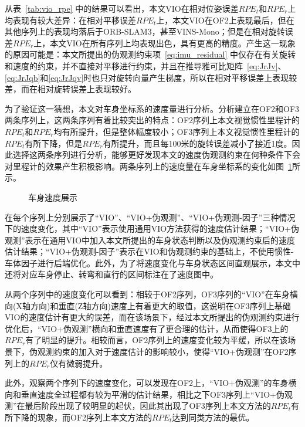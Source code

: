 从表~\ref{tab:vio_rpe} 中的结果可以看出，本文VIO在相对位姿误差$RPE_t$和$RPE_r$上均表现有较大差异：在相对平移误差$RPE_t$上，本文VIO在OF2上表现最后，但在其他序列上的表现均落后于ORB-SLAM3，甚至VINS-Mono；但是在相对旋转误差$RPE_r$上，本文VIO在所有序列上均表现出色，具有更高的精度。产生这一现象的原因可能是：本文所提出的伪观测约束项~\eqref{eq:imu_residual} 中仅存在有关旋转和速度的约束，并不直接对平移进行约束，并且在推导雅可比矩阵~\eqref{eq:JrJv}、\eqref{eq:JrJqb}和\eqref{eq:JrJqv}时也只对旋转向量产生梯度，所以在相对平移误差上表现较差，而在相对旋转误差上表现较好。

为了验证这一猜想，本文对车身坐标系的速度量进行分析。分析建立在OF2和OF3两条序列上，这两条序列有着比较突出的特点：OF2序列上本文视觉惯性里程计的$RPE_t$和$RPE_r$均有所提升，但是整体幅度较小；OF3序列上本文视觉惯性里程计的$RPE_t$有所下降，但是$RPE_r$有所提升，而且每100米的旋转误差减小了接近1度。因此选择这两条序列进行分析，能够更好发现本文的速度伪观测约束在何种条件下会对里程计的效果产生积极影响。两条序列上的速度量在车身坐标系的变化如图~\ref{fig:VIO_velocity}所示。

\begin{figure}
  \centering
  \caption{车身速度展示}
  \label{fig:VIO_velocity}
\end{figure}

在每个序列上分别展示了“VIO”、“VIO+伪观测”、“VIO+伪观测-因子”三种情况下的速度变化，其中“VIO”表示使用通用VIO方法获得的速度估计结果；“VIO+伪观测”表示在通用VIO中加入本文所提出的车身状态判断以及伪观测约束后的速度估计结果；“VIO+伪观测-因子”表示在VIO和伪观测约束的基础上，不使用惯性-车体因子进行后端优化。此外，为了将速度变化与车身状态区间直观展示，本文中还将对应车身停止、转弯和直行的区间标注在了速度图中。

从两个序列中的速度变化可以看到：相较于OF2序列，OF3序列的“VIO”在车身横向(X轴方向)和垂直(Z轴方向)速度上有着更大的取值，这说明在OF3序列上基础VIO的速度估计有更大的误差，而在该场景下，经过本文所提出的伪观测约束进行优化后，“VIO+伪观测”横向和垂直速度有了更合理的估计，从而使得OF3上的$RPE_r$有了明显的提升。相较而言，OF2序列上的速度变化较为平缓，所以在该场景下，伪观测约束的加入对于速度估计的影响较小，使得“VIO+伪观测”在OF2序列上的$RPE_r$仅有微弱提升。

此外，观察两个序列下的速度变化，可以发现在OF2上，“VIO+伪观测”的车身横向和垂直速度全过程都有较为平滑的估计结果，相比之下OF3序列上“VIO+伪观测”在最后阶段出现了较明显的起伏，因此其出现了OF3序列上本文方法的$RPE_t$有所下降的现象，而OF2序列上本文方法的$RPE_t$达到同类方法的最优。


